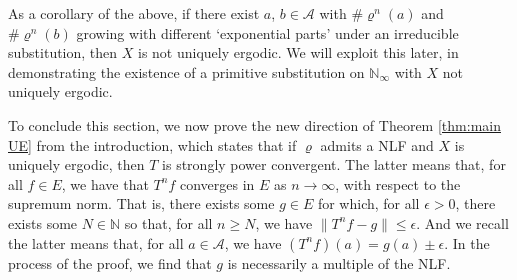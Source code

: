 \documentclass[11pt]{amsart}
\numberwithin{equation}{section}
\theoremstyle{plain}
\theoremstyle{definition}
\newcommand{\N}{{\mathbb N}}
\newcommand{\mc}{\mathcal}
\newcommand{\A}{\mc A}
\newcommand{\sub}{\varrho}
\begin{document}
As a corollary of the above, if there exist \(a\), \(b \in \A\) with \(\# \sub^n(a)\) and \(\# \sub^n(b)\) growing with different `exponential parts' under an irreducible substitution, then \(X\) is not uniquely ergodic. We will exploit this later, in demonstrating the existence of a primitive substitution on \(\N_\infty\) with \(X\) not uniquely ergodic.

To conclude this section, we now prove the new direction of Theorem \ref{thm:main UE} from the introduction, which states that if \(\sub\) admits a NLF and \(X\) is uniquely ergodic, then \(T\) is strongly power convergent. The latter means that, for all \(f \in E\), we have that \(T^n f\) converges in \(E\) as \(n \to \infty\), with respect to the supremum norm. That is, there exists some \(g \in E\) for which, for all \(\epsilon > 0\), there exists some \(N \in \N\) so that, for all \(n \geq N\), we have \(\|T^n f - g\| \leq \epsilon\). And we recall the latter means that, for all \(a \in \A\), we have \((T^n f)(a) = g(a) \pm \epsilon\). In the process of the proof, we find that \(g\) is necessarily a multiple of the NLF.
\end{document}
